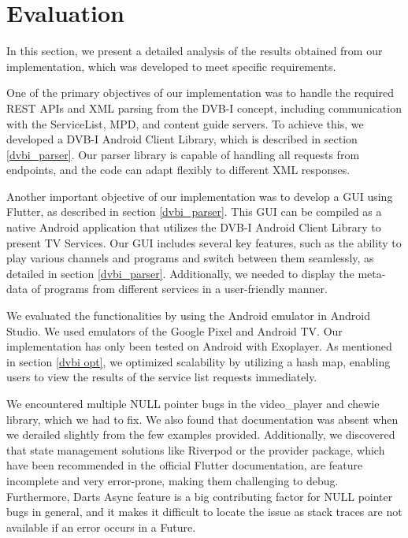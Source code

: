 \documentclass[conference]{IEEEtran}
\begin{document}
\section{Evaluation}




In this section, we present a detailed analysis of the results obtained from our implementation, which was developed to meet specific requirements.

One of the primary objectives of our implementation was to handle the required REST APIs and XML parsing from the DVB-I concept, including communication with the ServiceList, MPD, and content guide servers. To achieve this, we developed a DVB-I Android Client Library, which is described in section \ref{dvbi_parser}. Our parser library is capable of handling all requests from endpoints, and the code can adapt flexibly to different XML responses.

Another important objective of our implementation was to develop a GUI using Flutter, as described in section \ref{dvbi_parser}. This GUI can be compiled as a native Android application that utilizes the DVB-I Android Client Library to present TV Services. Our GUI includes several key features, such as the ability to play various channels and programs and switch between them seamlessly, as detailed in section \ref{dvbi_parser}. Additionally, we needed to display the meta-data of programs from different services in a user-friendly manner.

We evaluated the functionalities by using the Android emulator in Android Studio. We used emulators of the Google Pixel and Android TV. Our implementation has only been tested on Android with Exoplayer. As mentioned in section \ref{dvbi opt}, we optimized scalability by utilizing a hash map, enabling users to view the results of the service list requests immediately.

We encountered multiple NULL pointer bugs in the video\_player and chewie library, which we had to fix. We also found that documentation was absent when we derailed slightly from the few examples provided. Additionally, we discovered that state management solutions like Riverpod or the provider package, which have been recommended in the official Flutter documentation, are feature incomplete and very error-prone, making them challenging to debug. Furthermore, Darts Async feature is a big contributing factor for NULL pointer bugs in general, and it makes it difficult to locate the issue as stack traces are not available if an error occurs in a Future.
\end{document}
